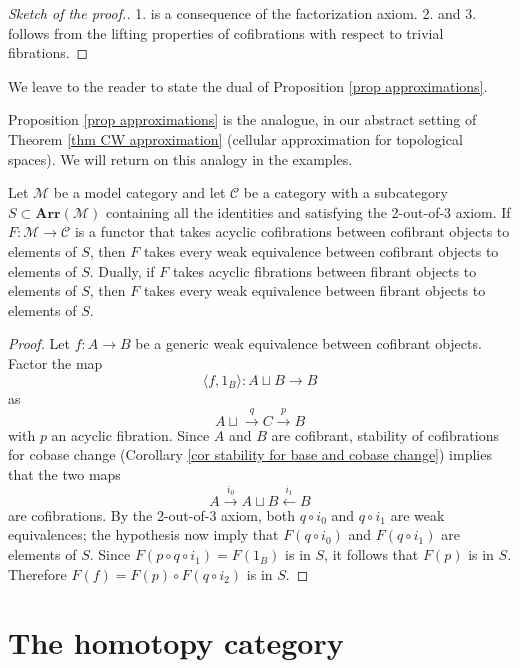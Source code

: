 \begin{proof}[Sketch of the proof.]
1. is a consequence of the factorization axiom. 2. and 3. follows from the lifting properties of cofibrations with respect to trivial fibrations. 
\end{proof}

\begin{rmk}
We leave to the reader to state the dual of Proposition \ref{prop approximations}.
\end{rmk}

\begin{rmk}
Proposition \ref{prop approximations} is the analogue, in our abstract setting of Theorem \ref{thm CW approximation} (cellular approximation for topological spaces). We will return on this analogy in the examples.
\end{rmk}

\begin{lemma} \label{lemma Ken Brown}
Let $\mathcal M$ be a model category and let $\mathcal C$ be a category with a subcategory $S \subset \mathbf{Arr}(\mathcal M)$ containing all the identities and satisfying the 2-out-of-3 axiom. If $F \colon \mathcal M \to \mathcal C$ is a functor that takes acyclic cofibrations between cofibrant objects to elements of $S$, then $F$ takes every weak equivalence between cofibrant objects to elements of $S$. Dually, if $F$ takes acyclic fibrations between fibrant objects to elements of $S$, then $F$ takes every weak equivalence between fibrant objects to elements of $S$.
\end{lemma}

\begin{proof}
Let $f \colon A \to B$ be a generic weak equivalence between cofibrant objects. Factor the map
\[
\langle f, 1_B \rangle \colon A \sqcup B \to B
\]
as
\[
A \sqcup \xrightarrow{q} C \xrightarrow{p} B
\]
with $p$ an acyclic fibration. Since $A$ and $B$ are cofibrant, stability of cofibrations for cobase change (Corollary \ref{cor stability for base and cobase change}) implies that the two maps
\[
A \xrightarrow{i_0} A \sqcup B \xleftarrow{i_1} B
\]
are cofibrations. By the 2-out-of-3 axiom, both $q \circ i_0$ and $q \circ i_1$ are weak equivalences; the hypothesis now imply that $F(q \circ i_0)$ and $F(q \circ i_1)$ are elements of $S$. Since $F(p \circ q \circ i_1) = F(1_B)$ is in $S$, it follows that $F(p)$ is in $S$. Therefore $F(f) = F(p) \circ F(q \circ i_2)$ is in $S$.
\end{proof}

\section{The homotopy category} \label{homotopy category}

